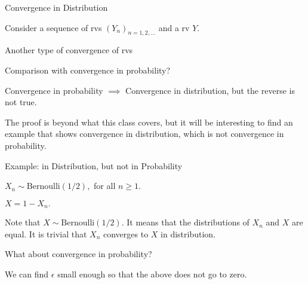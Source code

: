 \begin{frame}{Convergence in Distribution}

\plitemsep 0.1in
\bci
\item Consider a sequence of rvs $(Y_n)_{n=1,2, \ldots}$ and a rv $Y.$

{
}

\item<3-> Another type of convergence of rvs

\item<4-> Comparison with convergence in probability?
\bci
\item<5-> Convergence in probability $\implies$ Convergence in distribution, but the reverse is not true.

\item<5-> The proof is beyond what this class covers, but it will be interesting to find an example that shows convergence in distribution, which is not convergence in probability.
\eci

\eci
\end{frame}

\begin{frame}{Example: in Distribution, but not in Probability}

\plitemsep 0.1in
\bci
\item<1-> $X_n \sim \text{Bernoulli}(1/2),$ for all $n \ge 1.$

\item<2-> $X = 1-X_n.$

\item<3-> Note that $X \sim \text{Bernoulli}(1/2).$ It means that the distributions of $X_n$ and $X$ are equal. It is trivial that $X_n$ converges to $X$ in distribution.

\item<4-> What about convergence in probability?
\item<5-> We can find $\epsilon$ small enough so that the above does not go to zero.
\eci
\end{frame}


